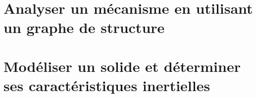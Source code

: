 \graphicspath{{\repStyle/png/}{../DYN/DYN-01/61_Hemostase/images/}} 
 
 
\graphicspath{{\repStyle/png/}{../DYN/DYN-01/61_Hemostase_02/images/}} 
 
 
\graphicspath{{\repStyle/png/}{../DYN/DYN-01/63_BancHydraulique/images/}} 
 
 
\section{Analyser un mécanisme en utilisant un graphe de structure} 
\section{Modéliser un solide et déterminer ses caractéristiques inertielles} 
\graphicspath{{\repStyle/png/}{../DYN/DYN-03-Inertie/40_Parallelepipede/images/}} 
 
 
\graphicspath{{\repStyle/png/}{../DYN/DYN-03-Inertie/41_Parallelepipede/images/}} 
 
 
\graphicspath{{\repStyle/png/}{../DYN/DYN-03-Inertie/42_Cylindre/images/}} 
 
 
\graphicspath{{\repStyle/png/}{../DYN/DYN-03-Inertie/43_Cylindre/images/}} 
 
 
\graphicspath{{\repStyle/png/}{../DYN/DYN-03-Inertie/44_Disque/images/}} 
 
 
\graphicspath{{\repStyle/png/}{../DYN/DYN-03-Inertie/45_Disque/images/}} 
 
 
\graphicspath{{\repStyle/png/}{../DYN/DYN-03-Inertie/50_BancBalafre/images/}} 
 
 
\graphicspath{{\repStyle/png/}{../DYN/DYN-03-Inertie/64_EPAS/images/}} 
 
 
\graphicspath{{\repStyle/png/}{../DYN/DYN-03-Inertie/65_Eclipse/images/}} 
 
 
